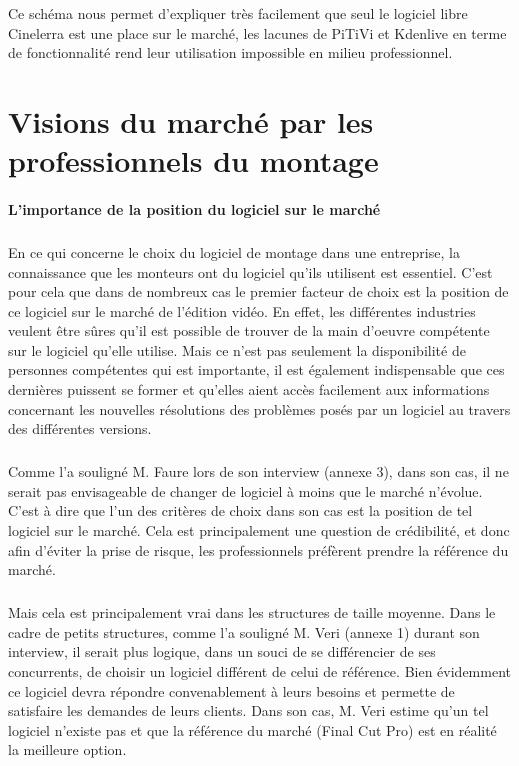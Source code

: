 Ce schéma nous permet d'expliquer très facilement que seul le logiciel
libre Cinelerra est une place sur le marché, les lacunes de PiTiVi et
Kdenlive en terme de fonctionnalité rend leur utilisation impossible
en milieu professionnel.

\newpage

\section{Visions du marché par les professionnels du montage}

\paragraph{L'importance de la position du logiciel sur le marché}

\subparagraph{}

En ce qui concerne le choix du logiciel de montage dans une entreprise,
la connaissance que les monteurs ont du logiciel qu'ils utilisent est
essentiel.  C'est pour cela que dans de nombreux cas le premier facteur
de choix est la position de ce logiciel sur le marché de l'édition
vidéo. En effet, les différentes industries veulent être sûres qu'il
est possible de trouver de la main d'oeuvre compétente sur le logiciel
qu'elle utilise.  Mais ce n'est pas seulement la disponibilité de
personnes compétentes qui est importante, il est également indispensable
que ces dernières puissent se former et qu'elles aient accès facilement
aux informations concernant les nouvelles résolutions des problèmes
posés par un logiciel au travers des différentes versions.


\subparagraph{}

Comme l'a souligné M. Faure lors de son interview
(annexe 3), dans son cas, il ne serait pas envisageable de changer de
logiciel à moins que le marché n'évolue. C'est à dire que l'un des
critères de choix dans son cas est la position de tel logiciel sur
le marché. Cela est principalement une question de crédibilité, et
donc afin d'éviter la prise de risque, les professionnels préfèrent
prendre la référence du marché.

\subparagraph{}

Mais cela est principalement vrai dans les structures de taille moyenne.
Dans le cadre de petits structures, comme l'a souligné M. Veri (annexe
1) durant son interview, il serait plus logique, dans un souci de se
différencier de ses concurrents, de choisir un logiciel différent
de celui de référence. Bien évidemment ce logiciel devra répondre
convenablement à leurs besoins et permette de satisfaire les demandes de
leurs clients. Dans son cas, M. Veri estime qu'un tel logiciel n'existe
pas et que la référence du marché (Final Cut Pro) est en réalité
la meilleure option.

